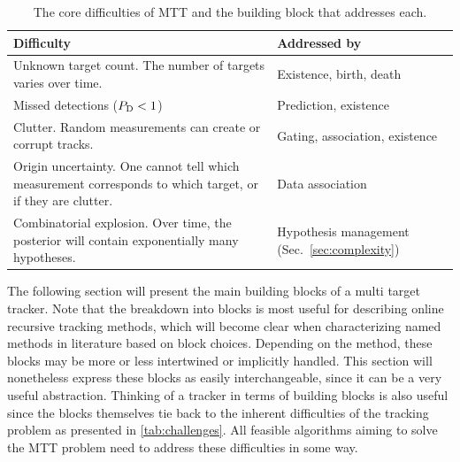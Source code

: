 \begin{table}[htbp]
\centering\small
\caption{The core difficulties of MTT and the building block that addresses each.}
\label{tab:challenges}
\begin{tabularx}{\textwidth}{X l}
\toprule
Difficulty & Addressed by \\
\midrule
Unknown target count. The number of targets varies over time. & Existence, birth, death \\ \addlinespace
Missed detections ($P_{\mathrm{D}}<1$) & Prediction, existence \\ \addlinespace
Clutter. Random measurements can create or corrupt tracks. & Gating, association, existence \\ \addlinespace
Origin uncertainty. One cannot tell which measurement corresponds to which target, or if they are clutter. & Data association \\ \addlinespace
Combinatorial explosion. Over time, the posterior will contain exponentially many hypotheses. & Hypothesis management (Sec.~\ref{sec:complexity}) \\
\bottomrule
\end{tabularx}
\end{table}

The following section will present the main building blocks of a multi target tracker. Note that the breakdown into blocks is most useful for describing online recursive tracking methods, which will become clear when characterizing named methods in literature based on block choices. Depending on the method, these blocks may be more or less intertwined or implicitly handled. This section will nonetheless express these blocks as easily interchangeable, since it can be a very useful abstraction. Thinking of a tracker in terms of building blocks is also useful since the blocks themselves tie back to the inherent difficulties of the tracking problem as presented in \autoref{tab:challenges}. All feasible algorithms aiming to solve the MTT problem need to address these difficulties in some way.

